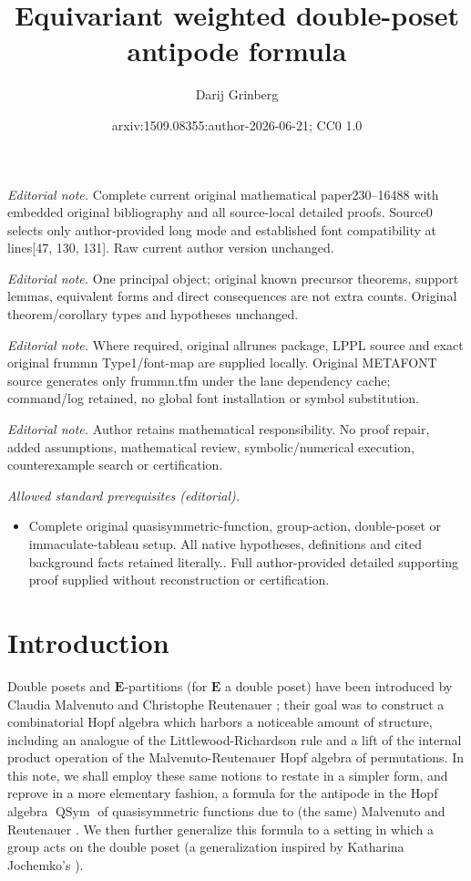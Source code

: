 \documentclass[numbers=enddot,12pt,final,onecolumn,notitlepage,abstracton]{scrartcl}
\title{Equivariant weighted double-poset antipode formula}
\author{Darij Grinberg}
\date{arxiv:1509.08355:author-2026-06-21; CC0 1.0}
\theoremstyle{definition}
\newcommand{\QSym}{{\operatorname{QSym}}}
\newcommand{\EE}{{\mathbf{E}}}
\begin{document}
\maketitle
\noindent\textit{Editorial note.} Complete current original mathematical paper230--16488 with embedded original bibliography and all source-local detailed proofs. Source0 selects only author-provided long mode and established font compatibility at lines[47, 130, 131]. Raw current author version unchanged.\par\medskip
\noindent\textit{Editorial note.} One principal object; original known precursor theorems, support lemmas, equivalent forms and direct consequences are not extra counts. Original theorem/corollary types and hypotheses unchanged.\par\medskip
\noindent\textit{Editorial note.} Where required, original allrunes package, LPPL source and exact original frummn Type1/font-map are supplied locally. Original METAFONT source generates only frummn.tfm under the lane dependency cache; command/log retained, no global font installation or symbol substitution.\par\medskip
\noindent\textit{Editorial note.} Author retains mathematical responsibility. No proof repair, added assumptions, mathematical review, symbolic/numerical execution, counterexample search or certification.\par\medskip
\noindent\textit{Allowed standard prerequisites (editorial).}\begin{itemize}
\item Complete original quasisymmetric-function, group-action, double-poset or immaculate-tableau setup. All native hypotheses, definitions and cited background facts retained literally.. Full author-provided detailed supporting proof supplied without reconstruction or certification.
\end{itemize}\medskip
\section{Introduction}
\label{sec:in}

Double posets and $\EE$-partitions (for $\EE$ a double poset)
have been introduced by Claudia Malvenuto and Christophe
Reutenauer \cite{Mal-Reu-DP}; their goal was to construct a
combinatorial Hopf algebra which harbors a noticeable amount of
structure, including an analogue of the Littlewood-Richardson
rule and a lift of the internal product operation of the
Malvenuto-Reutenauer Hopf algebra of permutations. In this note,
we shall employ these same notions to restate in a simpler form,
and reprove in a more elementary fashion, a formula for the
antipode in the Hopf algebra $\QSym$ of quasisymmetric functions
due to (the same) Malvenuto and Reutenauer
\cite[Theorem 3.1]{Mal-Reu}. We then further generalize this
formula to a setting in which a group acts on the double poset
(a generalization inspired by Katharina Jochemko's
\cite{Joch}).
\end{document}
